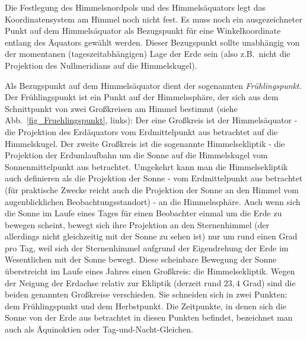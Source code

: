 Die Festlegung des Himmelsnordpols und des Himmels\"aquators legt das Koordinatensystem am
Himmel noch nicht fest. Es muss noch ein ausgezeichneter Punkt auf dem Himmels\"aquator als
Bezugspunkt f\"ur eine Winkelkoordinate entlang des \"Aquators gew\"ahlt werden. Dieser
Bezugspunkt sollte unabh\"angig von der momentanen (tageszeitabh\"angigen) Lage der Erde sein
(also z.B.\ nicht die Projektion des Nullmeridians auf die Himmelskugel). 

 Als Bezugspunkt auf dem Himmels\"aquator dient der sogenannten 
 \textit{Fr\"uhlingspunkt}. 
 Der Fr\"uhlingspunkt ist ein Punkt auf der Himmelssph\"are, der sich aus
dem Schnittpunkt von zwei Gro\ss kreisen am Himmel bestimmt (siehe Abb.\ \ref{fig_Fruehlingspunkt}, links):
 Der eine Gro\ss kreis ist der 
 Himmels\"aquator - die Projektion des Erd\"aquators vom Erdmittelpunkt
 aus betrachtet auf die Himmelskugel. Der zweite Gro\ss kreis ist die sogenannte Himmelsekliptik - 
 die Projektion der Erdumlaufbahn um die Sonne auf die Himmelskugel
 vom Sonnenmittelpunkt aus betrachtet. Umgekehrt kann man die Himmels\-ekliptik auch
 definieren als die Projektion der Sonne - vom Erdmittelpunkt aus betrachtet (f\"ur praktische Zwecke 
 reicht auch die Projektion der Sonne an den Himmel vom augenblicklichen Beobachtungsstandort) - 
 an die Himmelssph\"are. Auch wenn sich die Sonne im Laufe eines Tages f\"ur
 einen Beobachter einmal um die Erde zu bewegen scheint, bewegt sich ihre Projektion an den
 Sternenhimmel (der allerdings nicht gleichzeitig mit der Sonne zu sehen ist) nur um rund einen
 Grad pro Tag, weil sich der Sternenhimmel aufgrund der Eigendrehung der Erde im Wesentlichen 
 mit der Sonne bewegt. 
 Diese scheinbare Bewegung der Sonne \"uberstreicht im Laufe eines Jahres einen Gro\ss kreis:
 die Himmelsekliptik. Wegen der Neigung der Erdachse relativ zur Ekliptik (derzeit rund $23,4$ Grad) sind die
 beiden genannten Gro\ss kreise verschieden. Sie schneiden sich in zwei Punkten: dem
 Fr\"uhlingspunkt und dem Herbstpunkt. 
 Die Zeitpunkte, in denen sich die Sonne von
 der Erde aus betrachtet in diesen Punkten befindet, bezeichnet man auch als \"Aquinoktien oder
 Tag-und-Nacht-Gleichen. 

